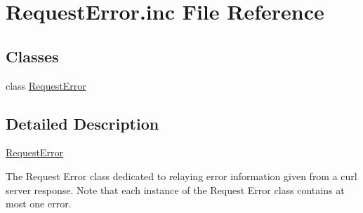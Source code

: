 \hypertarget{RequestError_8inc}{}\section{Request\+Error.\+inc File Reference}
\label{RequestError_8inc}
\subsection*{Classes}
\begin{DoxyCompactItemize}
\item 
class \hyperlink{classRequestError}{Request\+Error}
\end{DoxyCompactItemize}


\subsection{Detailed Description}
\hyperlink{classRequestError}{Request\+Error}

The Request Error class dedicated to relaying error information given from a curl server response. Note that each instance of the Request Error class contains at most one error. 